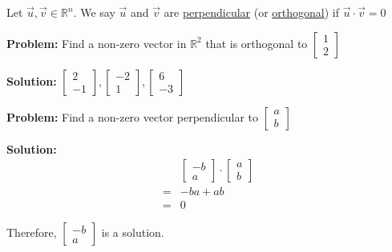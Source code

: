 \documentclass[11pt]{article}
\theoremstyle{plain}
\theoremstyle{remark}
\theoremstyle{plain}
\newcommand{\bd}{\textbf}
\newcommand{\rn}{\mathbb{R}}
\begin{document}
\begin{tcolorbox}[colback=green!5!white,colframe=green!75!black,title=Definition]
    Let $\overrightarrow{u}, \overrightarrow{v}\in \rn^n$. We say $\overrightarrow{u}$ and $\overrightarrow{v}$ are 
    \underline{perpendicular} (or \underline{orthogonal}) if $\overrightarrow{u}\cdot \overrightarrow{v} = 0$
\end{tcolorbox} 
\begin{tcolorbox}[colback=magenta!5!white,colframe = magenta!75!black,title=Example]
    \bd{Problem:} Find a non-zero vector in $\rn^2$ that is orthogonal to $\begin{bmatrix}
        1\\2
    \end{bmatrix}$

    \bd{Solution:}
    $\begin{bmatrix}
        2\\-1
    \end{bmatrix}, \begin{bmatrix}
        -2\\1
    \end{bmatrix}, \begin{bmatrix}
        6\\-3
    \end{bmatrix}$ 

\end{tcolorbox} 

\begin{tcolorbox}[colback=magenta!5!white,colframe = magenta!75!black,title=Example]
    \bd{Problem:} Find a non-zero vector perpendicular to $\begin{bmatrix}
        a\\b
    \end{bmatrix}$

    \bd{Solution:} \\
    \begin{align*}
        &\begin{bmatrix}
            -b\\a
        \end{bmatrix}
        \cdot \begin{bmatrix}
            a\\b
        \end{bmatrix} \\
        =& -ba+ab \\=&0
    \end{align*}

    Therefore, $\begin{bmatrix}
        -b \\a
    \end{bmatrix}$ is a solution.
\end{tcolorbox} 
\end{document}
